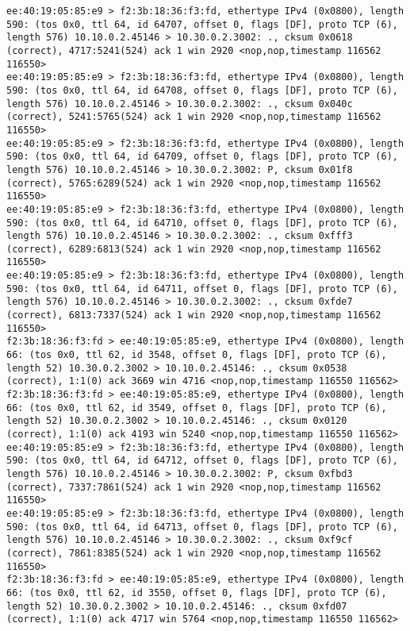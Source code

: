 \documentclass[a4paper,12pt]{article}
\begin{document}
\begin{Verbatim}
ee:40:19:05:85:e9 > f2:3b:18:36:f3:fd, ethertype IPv4 (0x0800), length 590: (tos 0x0, ttl 64, id 64707, offset 0, flags [DF], proto TCP (6), length 576) 10.10.0.2.45146 > 10.30.0.2.3002: ., cksum 0x0618 (correct), 4717:5241(524) ack 1 win 2920 <nop,nop,timestamp 116562 116550>
ee:40:19:05:85:e9 > f2:3b:18:36:f3:fd, ethertype IPv4 (0x0800), length 590: (tos 0x0, ttl 64, id 64708, offset 0, flags [DF], proto TCP (6), length 576) 10.10.0.2.45146 > 10.30.0.2.3002: ., cksum 0x040c (correct), 5241:5765(524) ack 1 win 2920 <nop,nop,timestamp 116562 116550>
ee:40:19:05:85:e9 > f2:3b:18:36:f3:fd, ethertype IPv4 (0x0800), length 590: (tos 0x0, ttl 64, id 64709, offset 0, flags [DF], proto TCP (6), length 576) 10.10.0.2.45146 > 10.30.0.2.3002: P, cksum 0x01f8 (correct), 5765:6289(524) ack 1 win 2920 <nop,nop,timestamp 116562 116550>
ee:40:19:05:85:e9 > f2:3b:18:36:f3:fd, ethertype IPv4 (0x0800), length 590: (tos 0x0, ttl 64, id 64710, offset 0, flags [DF], proto TCP (6), length 576) 10.10.0.2.45146 > 10.30.0.2.3002: ., cksum 0xfff3 (correct), 6289:6813(524) ack 1 win 2920 <nop,nop,timestamp 116562 116550>
ee:40:19:05:85:e9 > f2:3b:18:36:f3:fd, ethertype IPv4 (0x0800), length 590: (tos 0x0, ttl 64, id 64711, offset 0, flags [DF], proto TCP (6), length 576) 10.10.0.2.45146 > 10.30.0.2.3002: ., cksum 0xfde7 (correct), 6813:7337(524) ack 1 win 2920 <nop,nop,timestamp 116562 116550>
f2:3b:18:36:f3:fd > ee:40:19:05:85:e9, ethertype IPv4 (0x0800), length 66: (tos 0x0, ttl 62, id 3548, offset 0, flags [DF], proto TCP (6), length 52) 10.30.0.2.3002 > 10.10.0.2.45146: ., cksum 0x0538 (correct), 1:1(0) ack 3669 win 4716 <nop,nop,timestamp 116550 116562>
f2:3b:18:36:f3:fd > ee:40:19:05:85:e9, ethertype IPv4 (0x0800), length 66: (tos 0x0, ttl 62, id 3549, offset 0, flags [DF], proto TCP (6), length 52) 10.30.0.2.3002 > 10.10.0.2.45146: ., cksum 0x0120 (correct), 1:1(0) ack 4193 win 5240 <nop,nop,timestamp 116550 116562>
ee:40:19:05:85:e9 > f2:3b:18:36:f3:fd, ethertype IPv4 (0x0800), length 590: (tos 0x0, ttl 64, id 64712, offset 0, flags [DF], proto TCP (6), length 576) 10.10.0.2.45146 > 10.30.0.2.3002: P, cksum 0xfbd3 (correct), 7337:7861(524) ack 1 win 2920 <nop,nop,timestamp 116562 116550>
ee:40:19:05:85:e9 > f2:3b:18:36:f3:fd, ethertype IPv4 (0x0800), length 590: (tos 0x0, ttl 64, id 64713, offset 0, flags [DF], proto TCP (6), length 576) 10.10.0.2.45146 > 10.30.0.2.3002: ., cksum 0xf9cf (correct), 7861:8385(524) ack 1 win 2920 <nop,nop,timestamp 116562 116550>
f2:3b:18:36:f3:fd > ee:40:19:05:85:e9, ethertype IPv4 (0x0800), length 66: (tos 0x0, ttl 62, id 3550, offset 0, flags [DF], proto TCP (6), length 52) 10.30.0.2.3002 > 10.10.0.2.45146: ., cksum 0xfd07 (correct), 1:1(0) ack 4717 win 5764 <nop,nop,timestamp 116550 116562>

\end{Verbatim}
\end{document}
